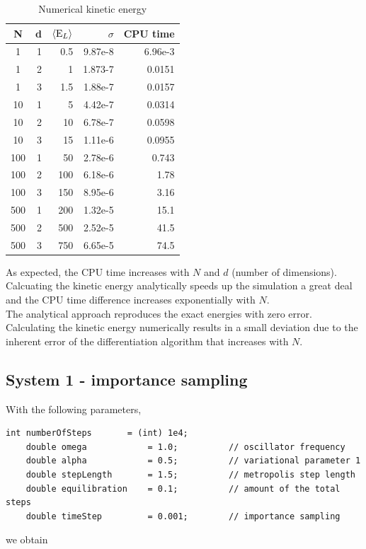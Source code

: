 \documentclass[english, a4paper]{article}
\begin{document}
\begin{table}[H]
  \centering
  \begin{tabular}{ | c | r | r | r | r |}
    \hline
    N& d& $\langle {\textrm E_L} \rangle$& $\sigma$& CPU time \\*
    \hline
    1& 1& 0.5& 9.87e-8& 6.96e-3 \\*
    \hline
    1& 2& 1& 1.873-7&  0.0151\\*
    \hline
    1& 3& 1.5& 1.88e-7&  0.0157\\*
    \hline
    10& 1& 5& 4.42e-7&  0.0314\\*
    \hline
    10& 2& 10& 6.78e-7&  0.0598\\*
    \hline
    10& 3& 15& 1.11e-6&  0.0955\\*
    \hline
    100& 1& 50& 2.78e-6&  0.743\\*
    \hline
    100& 2& 100& 6.18e-6&  1.78\\*
    \hline
    100& 3& 150& 8.95e-6&  3.16\\*
    \hline
    500& 1& 200& 1.32e-5&  15.1\\*
    \hline
    500& 2& 500& 2.52e-5&  41.5\\*
    \hline
    500& 3& 750& 6.65e-5&  74.5\\*
    \hline
  \end{tabular}
  \caption{Numerical kinetic energy}
  \label{tab:Tabell1}
\end{table}
As expected, the CPU time increases with $N$ and $d$ (number of dimensions).
Calcuating the kinetic energy analytically speeds up the simulation a great deal and 
the CPU time difference increases exponentially with $N$.\\
\noindent The analytical approach reproduces the exact energies with zero error. 
Calculating the kinetic energy numerically results in a small deviation due to the inherent 
error of the differentiation algorithm that increases with $N$.


\subsection{System 1 - importance sampling}

With the following parameters,
\belowcaptionskip=-10pt
\begin{lstlisting}[label=parameters2,caption=Parameters importance sampling Metropolis system 1]
    int numberOfSteps       = (int) 1e4;
    double omega            = 1.0;          // oscillator frequency
    double alpha            = 0.5;          // variational parameter 1
    double stepLength       = 1.5;          // metropolis step length
    double equilibration    = 0.1;          // amount of the total steps
    double timeStep         = 0.001;        // importance sampling
\end{lstlisting}
we obtain
\end{document}
